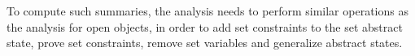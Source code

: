 To compute such summaries, the analysis needs to perform similar
operations as the analysis for open objects, in order to add set
constraints to the set abstract state, prove set constraints,
remove set variables and generalize abstract states.


